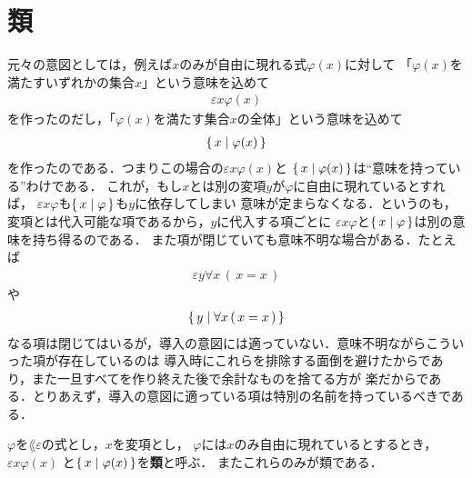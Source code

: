 \section{類}
	\begin{comment}
	\begin{screen}
		\begin{dfn}[閉項]
			どの変項も自由に現れない$\varepsilon$項を
			{\bf 閉${\boldsymbol \varepsilon}$項}\index{
			へいイプシロンこう@閉$\varepsilon$項}{\bf (closed epsilon term)}と呼び，
			どの変項も自由に現れない内包項を{\bf 閉内包項}\index{
			へいないほうこう@閉内包項}{\bf (closed comprehension term)}と呼ぶ．
			また閉$\varepsilon$項と閉内包項は以上のみである．
		\end{dfn}
	\end{screen}
	\end{comment}
	
	元々の意図としては，例えば$x$のみが自由に現れる式$\varphi(x)$に対して
	「$\varphi(x)$を満たすいずれかの集合$x$」という意味を込めて
	\begin{align}
		\varepsilon x \varphi(x)
	\end{align}
	を作ったのだし，「$\varphi(x)$を満たす集合$x$の全体」という意味を込めて
	\begin{align}
		\{\, x \mid \varphi(x)\, \}
	\end{align}
	を作ったのである．つまりこの場合の$\varepsilon x \varphi(x)$と
	$\{\, x \mid \varphi(x)\, \}$は``意味を持っている''わけである．
	これが，もし$x$とは別の変項$y$が$\varphi$に自由に現れているとすれば，
	$\varepsilon x \varphi$も$\{\, x \mid \varphi\, \}$も$y$に依存してしまい
	意味が定まらなくなる．というのも，変項とは代入可能な項であるから，$y$に代入する項ごとに
	$\varepsilon x \varphi$と$\{\, x \mid \varphi\, \}$は別の意味を持ち得るのである．
	また項が閉じていても意味不明な場合がある．たとえば
	\begin{align}
		\varepsilon y \forall x\, (\, x = x\, )
	\end{align}
	や
	\begin{align}
		\{\, y \mid \forall x\, (\, x = x\, )\, \}
	\end{align}
	なる項は閉じてはいるが，導入の意図には適っていない．意味不明ながらこういった項が存在しているのは
	導入時にこれらを排除する面倒を避けたからであり，また一旦すべてを作り終えた後で余計なものを捨てる方が
	楽だからである．とりあえず，導入の意図に適っている項は特別の名前を持っているべきである．
	
	\begin{screen}
		\begin{dfn}[類]
			$\varphi$を$\lang{\varepsilon}$の式とし，$x$を変項とし，
			$\varphi$には$x$のみ自由に現れているとするとき，$\varepsilon x \varphi(x)$
			と$\{\, x \mid \varphi(x)\, \}$を{\bf 類}と呼ぶ．
			またこれらのみが類である．
		\end{dfn}
	\end{screen}
	

